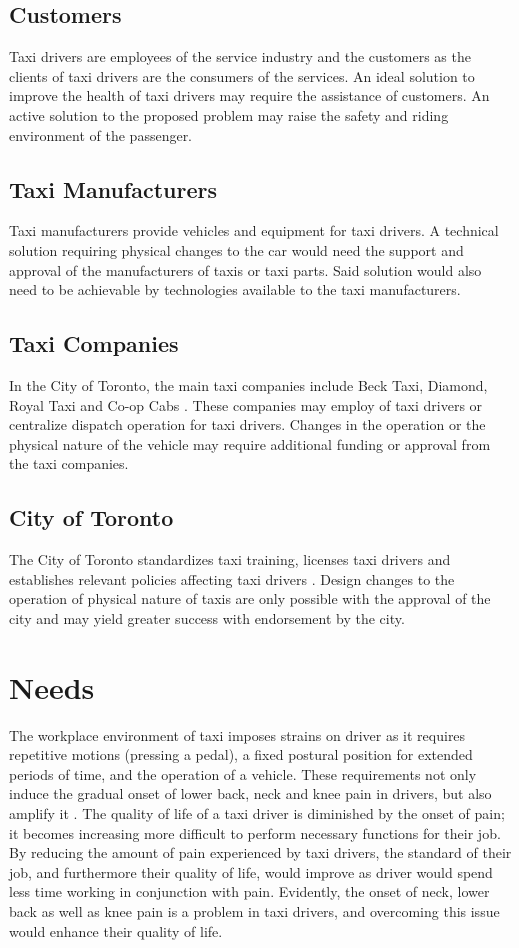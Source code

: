 \documentclass[11pt]{article}
\begin{document}
\subsection{Customers}
Taxi drivers are employees of the service industry and the customers
as the clients of taxi drivers are the consumers of the services. An
ideal solution to improve the health of taxi drivers may require the
assistance of customers. An active solution to the proposed problem
may raise the safety and riding environment of the passenger.
 
\subsection{Taxi Manufacturers}
Taxi manufacturers provide vehicles and equipment for taxi drivers. A
technical solution requiring physical changes to the car would need
the support and approval of the manufacturers of taxis or taxi
parts. Said solution would also need to be achievable by technologies
available to the taxi manufacturers.
 
\subsection{Taxi Companies}
In the City of Toronto, the main taxi companies include Beck Taxi,
Diamond, Royal Taxi and Co-op Cabs \cite{abouttaxis}. These companies
may employ of taxi drivers or centralize dispatch operation for taxi
drivers. Changes in the operation or the physical nature of the
vehicle may require additional funding or approval from the taxi
companies.
 
\subsection{City of Toronto}
The City of Toronto standardizes taxi training, licenses taxi drivers
and establishes relevant policies affecting taxi drivers
\cite{CityofToronto}. Design changes to the operation of physical
nature of taxis are only possible with the approval of the city and
may yield greater success with endorsement by the city.
\section{Needs}
\label{sec:needs}
The workplace environment of taxi imposes strains on driver as it
requires repetitive motions (pressing a pedal), a fixed postural
position for extended periods of time, and the operation of a
vehicle. These requirements not only induce the gradual onset of lower
back, neck and knee pain in drivers, but also amplify it
\cite{POSTULATED}. The quality of life of a taxi driver is diminished
by the onset of pain; it becomes increasing more difficult to perform
necessary functions for their job. By reducing the amount of pain
experienced by taxi drivers, the standard of their job, and
furthermore their quality of life, would improve as driver would spend
less time working in conjunction with pain. Evidently, the onset of
neck, lower back as well as knee pain is a problem in taxi drivers,
and overcoming this issue would enhance their quality of life.
 
\end{document}

